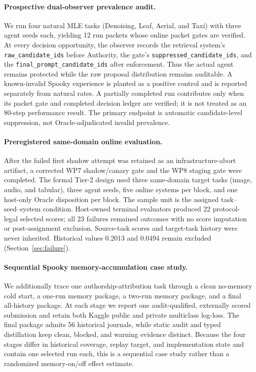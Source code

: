 \documentclass{article}
\begin{document}
\paragraph{Prospective dual-observer prevalence audit.}
We run four natural MLE tasks (Denoising, Leaf, Aerial, and Taxi) with three
agent seeds each, yielding 12 run packets whose online packet gates are
verified.  At every decision opportunity, the observer records the retrieval
system's \texttt{raw\_candidate\_ids} before Authority, the gate's
\texttt{suppressed\_candidate\_ids}, and the
\texttt{final\_prompt\_candidate\_ids} after enforcement.  Thus the actual
agent remains protected while the raw proposal distribution remains auditable.
A known-invalid Spooky experience is planted as a positive control and is
reported separately from natural rates.  A partially completed run contributes
only when its packet gate and completed decision ledger are verified; it is not
treated as an 80-step performance result.  The primary endpoint is automatic
candidate-level suppression, not Oracle-adjudicated invalid prevalence.

\paragraph{Preregistered same-domain online evaluation.}
After the failed first shadow attempt was retained as an infrastructure-abort
artifact, a corrected WP7 shadow/canary gate and the WP8 staging gate were
completed.  The formal Tier-2 design used three same-domain target tasks
(image, audio, and tabular), three agent seeds, five online systems per block,
and one host-only Oracle disposition per block.  The sample unit is the assigned
task--seed--system condition.  Host-owned terminal evaluators produced 22
protocol-legal selected scores; all 23 failures remained outcomes with no score
imputation or post-assignment exclusion.  Source-task scores and target-task
history were never inherited.  Historical values 0.2013 and 0.0494 remain
excluded (Section~\ref{sec:failure}).

\paragraph{Sequential Spooky memory-accumulation case study.}
We additionally trace one authorship-attribution task through a clean no-memory
cold start, a one-run memory package, a two-run memory package, and a final
all-history package.  At each stage we report one audit-qualified, externally scored
submission and retain both Kaggle public and private multiclass log-loss.  The
final package admits 56 historical journals, while static audit and typed
distillation keep clean, blocked, and warning evidence distinct.  Because the
four stages differ in historical coverage, replay target, and implementation
state and contain one selected run each, this is a sequential case study rather
than a randomized memory-on/off effect estimate.
\end{document}
